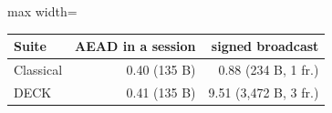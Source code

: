 \begin{adjustbox}{max width=\linewidth}
\begin{tabular}{lrr}
\toprule
Suite & AEAD in a session & signed broadcast \\
\midrule
Classical & 0.40 (135 B) & 0.88 (234 B, 1 fr.) \\
DECK & 0.41 (135 B) & 9.51 (3{,}472 B, 3 fr.) \\
\bottomrule
\end{tabular}
\end{adjustbox}
\par{}
